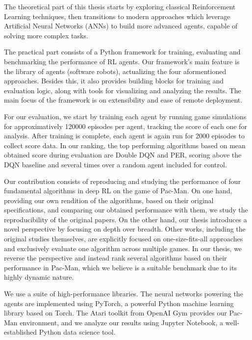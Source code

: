 \documentclass[12pt,twoside]{report}
\begin{document}

The theoretical part of this thesis starts by exploring classical Reinforcement Learning techniques, then transitions to modern approaches which leverage Artificial Neural Networks (ANNs) to build more advanced agents, capable of solving more complex tasks.

The practical part consists of a Python framework for training, evaluating and benchmarking the performance of RL agents.
Our framework's main feature is the library of agents (software robots), actualizing the four aformentioned approaches.
Besides this, it also provides building blocks for training and evaluation logic, along with tools for visualizing and analyzing the results.
The main focus of the framework is on extensibility and ease of remote deployment.

For our evaluation, we start by training each agent by running game simulations for approximatively \num{120000} episodes per agent, tracking the score of each one for analysis.
After training is complete, each agent is again run for \num{2000} episodes to collect score data.
In our ranking, the top performing algorithms based on mean obtained score during evaluation are Double DQN and PER, scoring above the DQN baseline and several times over a random agent included for control.

Our contribution consists of reproducing and studying the performance of four fundamental algorithms in deep RL on the game of Pac-Man.
On one hand, providing our own rendition of the algorithms, based on their original specifications, and comparing our obtained performance with them, we study the reproducibility of the original papers.
On the other hand, our thesis introduces a novel perspective by focusing on depth over breadth.
Other works, including the original studies themselves, are explicitly focused on one-size-fits-all approaches and exclusively evaluate one algorithm across multiple games.
In our thesis, we reverse the perspective and instead rank several algorithms based on their performance in Pac-Man, which we believe is a suitable benchmark due to its highly dynamic nature.

We use a suite of high-performance libraries. The neural networks powering the agents are implemented using PyTorch, a powerful Python machine learning library based on Torch. The Atari toolkit from OpenAI Gym provides our Pac-Man environment, and we analyze our results using Jupyter Notebook, a well-established Python data science tool.
\end{document}
